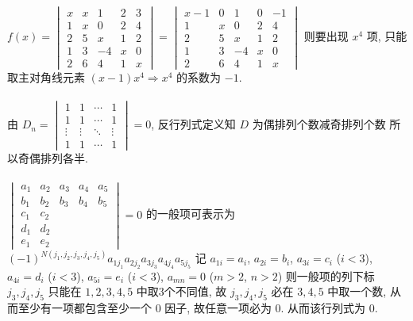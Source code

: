 \subsection{} %


	\paragraph{} %
		$f(x) = \begin{vmatrix}
				x & x & 1  & 2 & 3 \\
				1 & x & 0  & 2 & 4 \\
				2 & 5 & x  & 1 & 2 \\
				1 & 3 & -4 & x & 0 \\
				2 & 6 & 4  & 1 & x
			\end{vmatrix} = \begin{vmatrix}
				x-1 & 0 & 1  & 0 & -1 \\
				1   & x & 0  & 2 & 4  \\
				2   & 5 & x  & 1 & 2  \\
				1   & 3 & -4 & x & 0  \\
				2   & 6 & 4  & 1 & x
			\end{vmatrix}$
		则要出现 $x^4$ 项, 只能取主对角线元素
		$(x-1)x^4 \Rightarrow x^4$ 的系数为 $-1$.


	\paragraph{} %
		由 $D_n = \begin{vmatrix}
				1      & 1      & \cdots & 1      \\
				1      & 1      & \cdots & 1      \\
				\vdots & \vdots & \ddots & \vdots \\
				1      & 1      & \cdots & 1
			\end{vmatrix} = 0$, 反行列式定义知 $D$ 为偶排列个数减奇排列个数
		所以奇偶排列各半.


	\paragraph{} %
		$\begin{vmatrix}
				a_1 & a_2 & a_3 & a_4 & a_5 \\
				b_1 & b_2 & b_3 & b_4 & b_5 \\
				c_1 & c_2 &     &     &     \\
				d_1 & d_2 &     &     &     \\
				e_1 & e_2 &     &     &
			\end{vmatrix} = 0$ 的一般项可表示为 $(-1)^{N(j_1,j_2,j_3,j_4,j_5)} a_{1j_1}a_{2j_2}a_{3j_3}a_{4j_4}a_{5j_5}$
		记 $a_{1i} = a_i$, $a_{2i} = b_i$, $a_{3i} = c_i$ ($i < 3$), $a_{4i} = d_i$ ($i < 3$), $a_{5i} = e_i$ ($i < 3$), $a_{mn} = 0$ ($m > 2$, $n > 2$)
		则一般项的列下标 $j_3,j_4,j_5$ 只能在 $1,2,3,4,5$ 中取3个不同值,
		故 $j_3,j_4,j_5$ 必在 $3,4,5$ 中取一个数, 从而至少有一项都包含至少一个 $0$ 因子, 故任意一项必为 $0$. 从而该行列式为 $0$.

